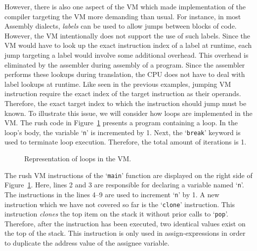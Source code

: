 However, there is also one aspect of the VM which made implementation of the compiler targeting the VM more demanding than usual.
For instance, in most Assembly dialects, \emph{labels} can be used to allow jumps between blocks of code.
However, the VM intentionally does not support the use of such labels.
Since the VM would have to look up the exact instruction index of a label at runtime,
each jump targeting a label would involve some additional overhead.
This overhead is eliminated by the assembler during assembly of a program.
Since the assembler performs these lookups during translation,
the CPU does not have to deal with label lookups at runtime.
Like seen in the previous examples, jumping VM instruction require the exact index of the target instruction as their operands.
Therefore, the exact target index to which the instruction should jump must be known.
To illustrate this issue, we will consider how loops are implemented in the VM\@.
The rush code in Figure~\ref{fig:vm_loops} presents a program containing a loop.
In the loop's body, the variable `\texttt{n}' is incremented by 1.
Next, the `\texttt{break}' keyword is used to terminate loop execution.
Therefore, the total amount of iterations is 1.

\noindent
\begin{figure}[h]
	\begin{minipage}{.5\textwidth}
		\centering
	\end{minipage}%
	\hfill
	\begin{minipage}{.5\textwidth}
		\centering
	\end{minipage}
	\caption{Representation of loops in the VM.}\label{fig:vm_loops}
\end{figure}

The rush VM instructions of the `\texttt{main}' function are displayed on the right side of Figure~\ref{fig:vm_loops}.
Here, lines 2 and 3 are responsible for declaring a variable named `\texttt{n}'.
The instructions in the lines 4--9 are used to increment `\texttt{n}' by 1.
A new instruction which we have not covered so far is the `\texttt{clone}' instruction.
This instruction \emph{clones} the top item on the stack it without prior calls to `\texttt{pop}'.
Therefore, after the instruction has been executed, two identical values exist on the top of the stack.
This instruction is only used in assign-expressions in order to duplicate the address value of the assignee variable.

